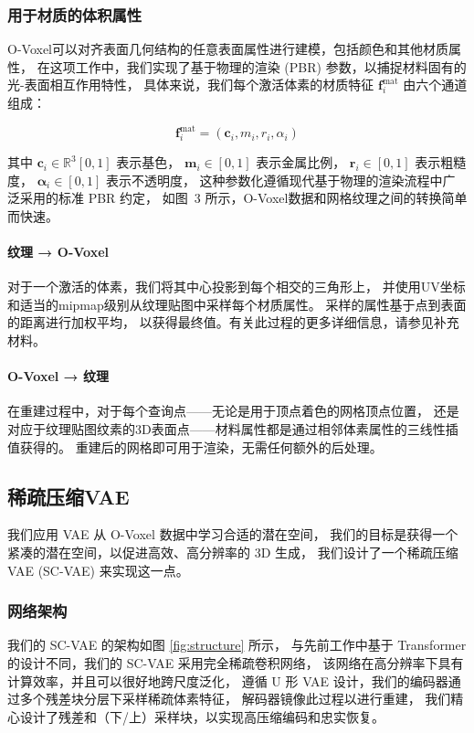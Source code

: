 \subsubsection{用于材质的体积属性}
O-Voxel可以对齐表面几何结构的任意表面属性进行建模，包括颜色和其他材质属性，  
在这项工作中，我们实现了基于物理的渲染 (PBR) 参数，以捕捉材料固有的光-表面相互作用特性，  
具体来说，我们每个激活体素的材质特征 $\bm{f}^{\text{mat}}_i$ 由六个通道组成：

\begin{equation}
    \bm{f}^{\text{mat}}_i = (\bm{c}_i, m_i, r_i, \alpha_i) \tag{3}
\end{equation}

其中 $\bm{c}_i \in \mathbb{R}^3 [0,1]$ 表示基色，  
$\bm{m}_i \in [0,1]$ 表示金属比例，  
$\bm{r}_i \in [0,1]$ 表示粗糙度，  
$\bm{\alpha}_i \in [0,1]$ 表示不透明度，  
这种参数化遵循现代基于物理的渲染流程中广泛采用的标准 PBR 约定，  
如图~3 所示，O-Voxel数据和网格纹理之间的转换简单而快速。

\paragraph{纹理 → O-Voxel}
对于一个激活的体素，我们将其中心投影到每个相交的三角形上，
并使用UV坐标和适当的mipmap级别从纹理贴图中采样每个材质属性。
采样的属性基于点到表面的距离进行加权平均，
以获得最终值。有关此过程的更多详细信息，请参见补充材料。

\paragraph{O-Voxel → 纹理}
在重建过程中，对于每个查询点——无论是用于顶点着色的网格顶点位置，
还是对应于纹理贴图纹素的3D表面点——材料属性都是通过相邻体素属性的三线性插值获得的。
重建后的网格即可用于渲染，无需任何额外的后处理。

\subsection{稀疏压缩VAE}
我们应用 VAE 从 O-Voxel 数据中学习合适的潜在空间，  
我们的目标是获得一个紧凑的潜在空间，以促进高效、高分辨率的 3D 生成，  
我们设计了一个稀疏压缩 VAE (SC-VAE) 来实现这一点。

\subsubsection{网络架构}

我们的 SC-VAE 的架构如图 \ref{fig:structure} 所示，  
与先前工作中基于 Transformer 的设计不同，我们的 SC-VAE 采用完全稀疏卷积网络，
该网络在高分辨率下具有计算效率，并且可以很好地跨尺度泛化，  
遵循 U 形 VAE 设计，我们的编码器通过多个残差块分层下采样稀疏体素特征，
解码器镜像此过程以进行重建，  
我们精心设计了残差和（下/上）采样块，以实现高压缩编码和忠实恢复。


